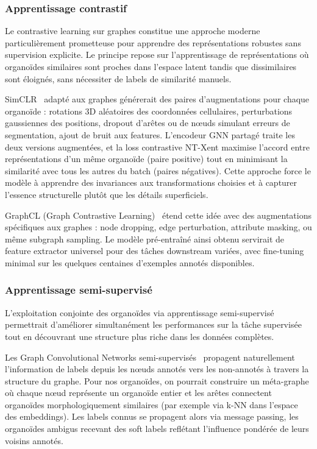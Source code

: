 \subsubsection{Apprentissage contrastif}

Le contrastive learning sur graphes constitue une approche moderne particulièrement prometteuse pour apprendre des représentations robustes sans supervision explicite. Le principe repose sur l'apprentissage de représentations où organoïdes similaires sont proches dans l'espace latent tandis que dissimilaires sont éloignés, sans nécessiter de labels de similarité manuels.

SimCLR~\cite{Chen2020SimCLR} adapté aux graphes générerait des paires d'augmentations pour chaque organoïde : rotations 3D aléatoires des coordonnées cellulaires, perturbations gaussiennes des positions, dropout d'arêtes ou de nœuds simulant erreurs de segmentation, ajout de bruit aux features. L'encodeur GNN partagé traite les deux versions augmentées, et la loss contrastive NT-Xent maximise l'accord entre représentations d'un même organoïde (paire positive) tout en minimisant la similarité avec tous les autres du batch (paires négatives). Cette approche force le modèle à apprendre des invariances aux transformations choisies et à capturer l'essence structurelle plutôt que les détails superficiels.

GraphCL (Graph Contrastive Learning)~\cite{You2020} étend cette idée avec des augmentations spécifiques aux graphes : node dropping, edge perturbation, attribute masking, ou même subgraph sampling. Le modèle pré-entraîné ainsi obtenu servirait de feature extractor universel pour des tâches downstream variées, avec fine-tuning minimal sur les quelques centaines d'exemples annotés disponibles.

\subsubsection{Apprentissage semi-supervisé}

L'exploitation conjointe des organoïdes via apprentissage semi-supervisé permettrait d'améliorer simultanément les performances sur la tâche supervisée tout en découvrant une structure plus riche dans les données complètes.

Les Graph Convolutional Networks semi-supervisés~\cite{Kipf2017} propagent naturellement l'information de labels depuis les nœuds annotés vers les non-annotés à travers la structure du graphe. Pour nos organoïdes, on pourrait construire un méta-graphe où chaque nœud représente un organoïde entier et les arêtes connectent organoïdes morphologiquement similaires (par exemple via k-NN dans l'espace des embeddings). Les labels connus se propagent alors via message passing, les organoïdes ambigus recevant des soft labels reflétant l'influence pondérée de leurs voisins annotés.

